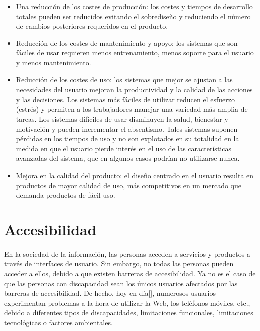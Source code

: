 \begin{itemize}
\item Una reducción de los costes de producción: los costes y tiempos de desarrollo totales pueden ser reducidos evitando el sobrediseño y reduciendo el número de cambios posteriores requeridos en el producto.
\item Reducción de los costes de mantenimiento y apoyo: los sistemas que son fáciles de usar requieren menos entrenamiento, menos soporte para el usuario y menos mantenimiento.
\item Reducción de los costes de uso: los sistemas que mejor se ajustan a las necesidades del usuario mejoran la productividad y la calidad de las acciones y las decisiones. Los sistemas más fáciles de utilizar reducen el esfuerzo (estrés) y permiten a los trabajadores manejar una variedad más amplia de tareas. Los sistemas difíciles de usar disminuyen la salud, bienestar y motivación y pueden incrementar el absentismo. Tales sistemas suponen pérdidas en los tiempos de uso y no son explotados en su totalidad en la medida en que el usuario pierde interés en el uso de las características avanzadas del sistema, que en algunos casos podrían no utilizarse nunca.
\item Mejora en la calidad del producto: el diseño centrado en el usuario resulta en productos de mayor calidad de uso, más competitivos en un mercado que demanda productos de fácil uso.
\end{itemize}

\section{Accesibilidad}

En la sociedad de la información, las personas acceden a servicios y productos a través de interfaces de usuario. Sin embargo, no todas las personas pueden acceder a ellos, debido a que existen barreras de accesibilidad. Ya no es el caso de que las personas con discapacidad sean los únicos usuarios afectados por las barreras de accesibilidad. De hecho, hoy en día[\cite{39}], numerosos usuarios experimentan problemas a la hora de utilizar la Web, los teléfonos móviles, etc., debido a diferentes tipos de discapacidades, limitaciones funcionales, limitaciones tecnológicas o factores ambientales.



